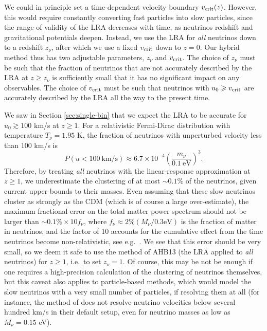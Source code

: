 \documentclass[useAMS, usenatbib]{mnras}
\newcommand{\beq}{\begin{equation}}
\newcommand{\eeq}{\end{equation}}
\begin{document}
We could in principle set a time-dependent velocity boundary $v_{\rm crit}(z)$. However, this would require constantly converting fast particles into slow particles, since the range of validity of the LRA decreases with time, as neutrinos redshift and gravitational potentials deepen. Instead, we use the LRA for \emph{all} neutrinos down to a redshift $z_\nu$, after which we use a fixed $v_{\rm crit}$ down to $z = 0$. Our hybrid method thus has two adjustable parameters, $z_\nu$ and $v_{\rm crit}$. The choice of $z_\nu$ must be such that the fraction of neutrinos that are not accurately described by the LRA at $z \geq z_\nu$ is sufficiently small that it has no significant impact on any observables. The choice of $v_{\rm crit}$ must be such that neutrinos with $u_0 \geq v_{\rm crit}$ are accurately described by the LRA all the way to the present time.

We saw in Section \ref{sec:single-bin} that we expect the LRA to be accurate for $u_0 \gtrsim 100$ km/s at $z \geq 1$. For a relativistic Fermi-Dirac distribution with temperature $T_\nu = 1.95$ K, the fraction of neutrinos with unperturbed velocity less than $100$ km/s is
\beq
P(u < 100 ~\textrm{km/s}) \approx 6.7 \times 10^{-4} \left(\frac{m_{\nu}}{0.1~\textrm{eV}}\right)^3.
\eeq
Therefore, by treating \emph{all} neutrinos with the linear-response approximation at $z \geq 1$, we underestimate the clustering of at most $\sim 0.1\%$ of the neutrinos, given current upper bounds to their masses. Even assuming that these slow neutrinos cluster as strongly as the CDM (which is of course a large over-estimate), the maximum fractional error on the total matter power spectrum should not be larger than $\sim 0.1\% \times 10 f_{\nu}$, where $f_\nu \approx 2\% (M_\nu/0.3 \textrm{eV})$ is the fraction of matter in neutrinos, and the factor of 10 accounts for the cumulative effect from the time neutrinos become non-relativistic, see e.g.~\cite{Lesgourgues_2006}. We see that this error should be very small, so we deem it safe to use the method of AHB13 (the LRA applied to \emph{all} neutrinos) for $z \geq 1$, i.e.~to set $z_\nu = 1$. Of course, this may be not be enough if one requires a high-precision calculation of the clustering of neutrinos themselves, but this caveat also applies to particle-based methods, which would model the slow neutrinos with a very small number of particles, if resolving them at all (for instance, the method of \cite{Banerjee_2018} does not resolve neutrino velocities below several hundred km/s in their default setup, even for neutrino masses as low as $M_\nu = 0.15$ eV).
\end{document}
